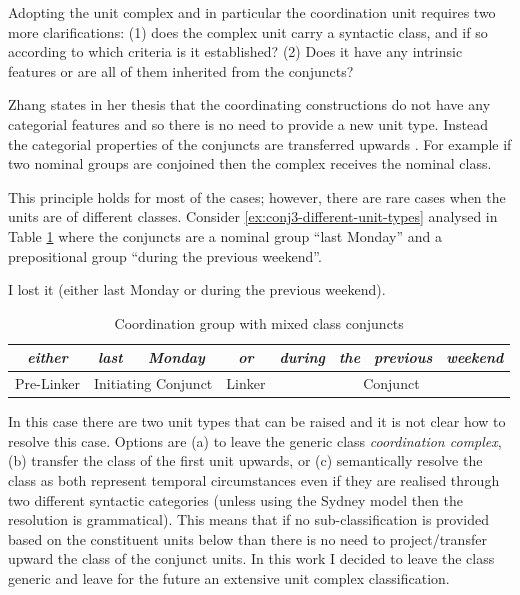     Adopting the unit complex and in particular the coordination unit requires two more clarifications: (1) does the complex unit carry a syntactic class, and if so according to which criteria is it established? (2) Does it have any intrinsic features or are all of them inherited from the conjuncts?
    
    Zhang states in her thesis that the coordinating constructions do not have any categorial features and so there is no need to provide a new unit type. Instead the categorial properties of the conjuncts are transferred upwards \citep{NinaZhang2010}. For example if two nominal groups are conjoined then the complex receives the nominal class.  
    
    This principle holds for most of the cases; however, there are rare cases when the units are of different classes. Consider \ref{ex:conj3-different-unit-types} analysed in Table \ref{tab:mixed-coordination} where the conjuncts are a nominal group ``last Monday'' and a prepositional group ``during the previous weekend''.
    
    \begin{exe}
    	\ex\label{ex:conj3-different-unit-types}
    	I lost it (either last Monday or during the previous weekend). 
    \end{exe}
    
    \begin{table}[!ht]
        \centering
        \begin{tabular}{|c|c|c|c|c|c|c|c|}
            \hline
            \textit{either} & \textit{last} & \textit{Monday} & \textit{or} & \textit{during} & \textit{the} & \textit{previous} & \textit{weekend} \\ \hline
            Pre-Linker & \multicolumn{2}{c|}{Initiating Conjunct} & Linker & \multicolumn{4}{c|}{Conjunct} \\ \hline
        \end{tabular}
        \caption{Coordination group with mixed class conjuncts}
        \label{tab:mixed-coordination}
    \end{table}
    
    In this case there are two unit types that can be raised and it is not clear how to resolve this case. Options are (a) to leave the generic class \textit{coordination complex}, (b) transfer the class of the first unit upwards, or (c) semantically resolve the class as both represent temporal circumstances even if they are realised through two different syntactic categories (unless using the Sydney model then the resolution is grammatical). This means that if no sub-classification is provided based on the constituent units below than there is no need to project/transfer upward the class of the conjunct units. In this work I decided to leave the class generic and leave for the future an extensive unit complex classification.
    
